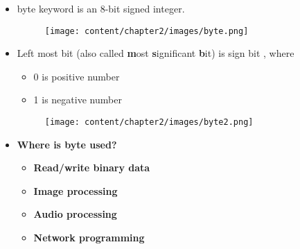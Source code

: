 

\begin{flushleft}

	\begin{itemize}
		\item byte keyword is an 8-bit signed integer. 
		
		
		\begin{figure}[h!]
			\centering
			\texttt{[image: content/chapter2/images/byte.png]}
		\end{figure}		
		\item Left most bit (also called \textbf{m}ost \textbf{s}ignificant \textbf{b}it) is sign bit , where 
		\begin{itemize}
			\item 0 is positive number
			\item 1 is negative number
		\end{itemize}
		
		\begin{figure}[h!]
			\centering
			\texttt{[image: content/chapter2/images/byte2.png]}
		\end{figure}		
		
	
		\item \textbf{Where is byte used?}
		\begin{itemize}
			\item \textbf{Read/write binary data}
			\item \textbf{Image processing}			
			\item \textbf{Audio processing}
			\item \textbf{Network programming}
		\end{itemize}	
	\end{itemize}
	
\end{flushleft}
